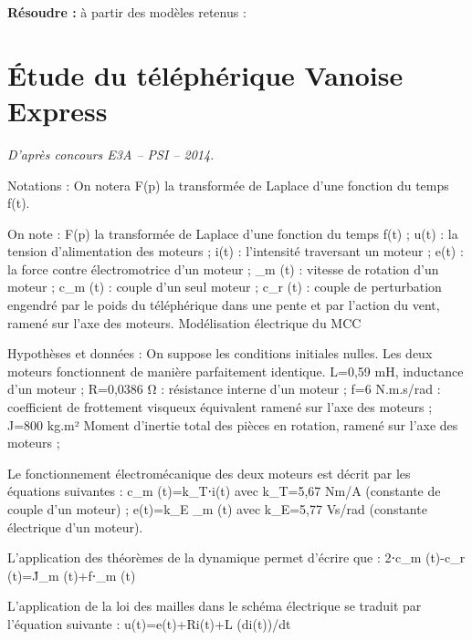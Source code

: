 \documentclass[10pt]{article}
\begin{document}






\begin{comp}
\noindent \textbf{Résoudre :} à partir des modèles retenus :


\end{comp}

\section*{Étude du téléphérique Vanoise Express}

\begin{flushright}
\textit{D'après concours E3A -- PSI -- 2014.}
\end{flushright}



Notations :
On notera F(p) la transformée de Laplace d’une fonction du temps f(t).

On note : 
	F(p) la transformée de Laplace d’une fonction du temps f(t) ;
	u(t) : la tension d’alimentation des moteurs ;
	i(t) : l’intensité traversant un moteur ;
	e(t) : la force contre électromotrice d’un moteur ;
	\omega_m (t) : vitesse de rotation d’un moteur ;
	c_m (t) : couple d’un seul moteur ;
	c_r (t) : couple de perturbation engendré par le poids du téléphérique dans une pente et par l’action du vent, ramené sur l’axe des moteurs.	 
Modélisation électrique du MCC

Hypothèses et données :
On suppose les conditions initiales nulles. Les deux moteurs fonctionnent de manière parfaitement identique.
	L=0,59 mH, inductance d’un moteur ;
	R=0,0386 Ω : résistance interne d’un moteur ;
	f=6 N.m.s/rad : coefficient de frottement visqueux équivalent ramené sur l’axe des moteurs ;
	J=800 kg.m² Moment d’inertie total des pièces en rotation, ramené sur l’axe des moteurs ;

Le fonctionnement électromécanique des deux moteurs est décrit par les équations suivantes :
	c_m (t)=k_T⋅i(t) avec k_T=5,67 Nm/A (constante de couple d’un moteur) ;
	e(t)=k_E \omega_m (t) avec k_E=5,77 Vs/rad (constante électrique d’un moteur).

L’application des théorèmes de la dynamique permet d’écrire que : 
	2⋅c_m (t)-c_r (t)=J\omega ̇_m (t)+f⋅\omega_m (t)

L’application de la loi des mailles dans le schéma électrique se traduit par l’équation suivante :
	u(t)=e(t)+Ri(t)+L (di(t))/dt
\end{document}
